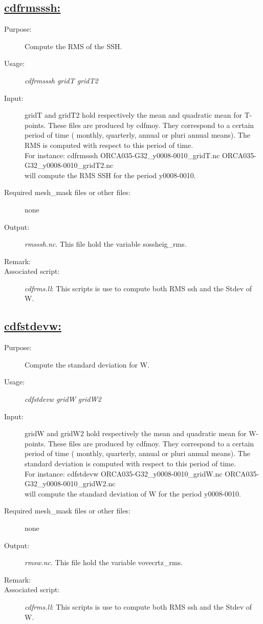 \documentclass[a4paper,11pt]{article}
\begin{document}
\subsection*{\underline{cdfrmsssh:}}
\begin{description}
\item[Purpose:] Compute the RMS of the SSH.
\item[Usage:] {\em cdfrmsssh gridT gridT2 }
\item[Input:] gridT and gridT2 hold respectively the mean and quadratic mean for T-points.
These files are produced by cdfmoy. They correspond to a certain period of time ( monthly, quarterly, annual or
pluri annual means). The RMS is computed with respect to this period of time. \\
For instance: cdfrmsssh ORCA035-G32\_y0008-0010\_gridT.nc ORCA035-G32\_y0008-0010\_gridT2.nc \\
will compute the RMS SSH for the period y0008-0010.
\item[Required mesh\_mask files or other files:]  none
\item[Output:] {\em rmsssh.nc}. This file hold the variable sossheig\_rms.
\item[Remark:]  
\item[Associated script:] {\em cdfrms.ll}: This scripts is use to compute both RMS ssh and the Stdev of W.
\end{description}

\newpage
\subsection*{\underline{cdfstdevw:}}
\begin{description}
\item[Purpose:] Compute the standard deviation for W.
\item[Usage:] {\em cdfstdevw gridW gridW2 }
\item[Input:] gridW and gridW2 hold respectively the mean and quadratic mean for W-points.
These files are produced by cdfmoy. They correspond to a certain period of time ( monthly, quarterly, annual or
pluri annual means). The standard deviation is computed with respect to this period of time. \\
For instance: cdfstdevw ORCA035-G32\_y0008-0010\_gridW.nc ORCA035-G32\_y0008-0010\_gridW2.nc \\
will compute the standard deviation of W  for the period y0008-0010.
\item[Required mesh\_mask files or other files:]  none
\item[Output:] {\em rmsw.nc}. This file hold the variable vovecrtz\_rms.
\item[Remark:]  
\item[Associated script:] {\em cdfrms.ll}: This scripts is use to compute both RMS ssh and the Stdev of W.
\end{description}
\end{document}
